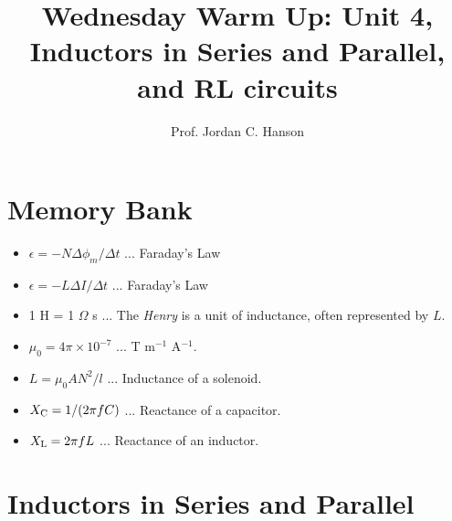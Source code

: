 \documentclass{article}
\begin{document}
\twocolumn

\title{Wednesday Warm Up: Unit 4, Inductors in Series and Parallel, and RL circuits}
\author{Prof. Jordan C. Hanson}

\maketitle

\section{Memory Bank}

\begin{itemize}
\item $\epsilon = -N \Delta \phi_m /\Delta t$ ... Faraday's Law
\item $\epsilon = -L \Delta I /\Delta t$ ... Faraday's Law
\item 1 H = 1 $\Omega$ s ... The \textit{Henry} is a unit of inductance, often represented by $L$.
\item $\mu_0 = 4\pi \times 10^{-7}$ ... T m$^{-1}$ A$^{-1}$.
\item $L = \mu_0 A N^2/l$ ... Inductance of a solenoid.
\item $X_{\rm C} = 1/(2\pi fC)$ ... Reactance of a capacitor.
\item $X_{\rm L} = 2\pi fL$ ... Reactance of an inductor.
\end{itemize}

\section{Inductors in Series and Parallel}
\end{document}
